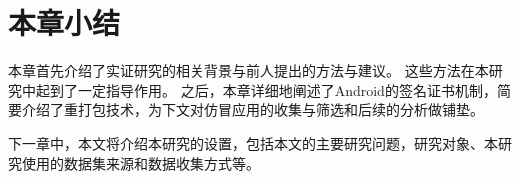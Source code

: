 \section{本章小结}
本章首先介绍了实证研究的相关背景与前人提出的方法与建议。
这些方法在本研究中起到了一定指导作用。
之后，本章详细地阐述了Android的签名证书机制，简要介绍了重打包技术，为下文对仿冒应用的收集与筛选和后续的分析做铺垫。

下一章中，本文将介绍本研究的设置，包括本文的主要研究问题，研究对象、本研究使用的数据集来源和数据收集方式等。


